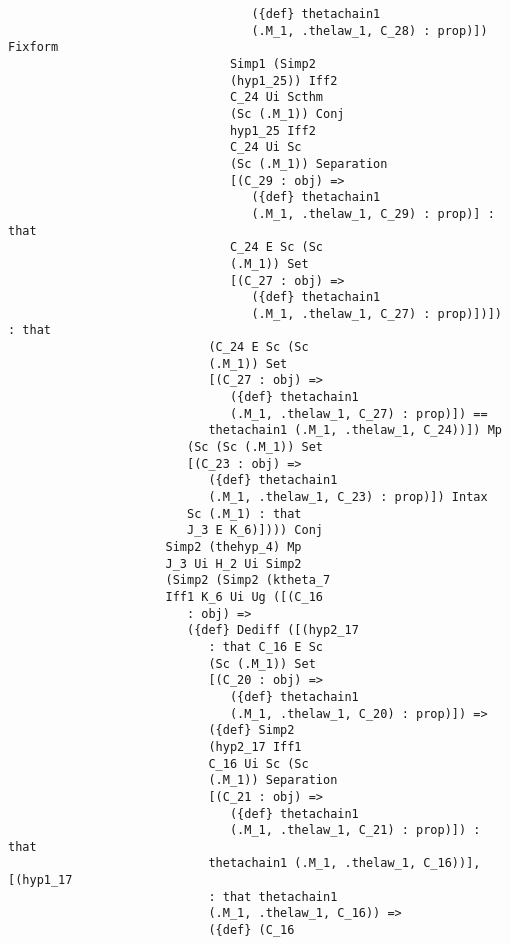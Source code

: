 \documentclass[12pt]{article}
\begin{document}
\begin{verbatim}
                                  ({def} thetachain1 
                                  (.M_1, .thelaw_1, C_28) : prop)]) Fixform 
                               Simp1 (Simp2 
                               (hyp1_25)) Iff2 
                               C_24 Ui Scthm 
                               (Sc (.M_1)) Conj 
                               hyp1_25 Iff2 
                               C_24 Ui Sc 
                               (Sc (.M_1)) Separation 
                               [(C_29 : obj) => 
                                  ({def} thetachain1 
                                  (.M_1, .thelaw_1, C_29) : prop)] : that 
                               C_24 E Sc (Sc 
                               (.M_1)) Set 
                               [(C_27 : obj) => 
                                  ({def} thetachain1 
                                  (.M_1, .thelaw_1, C_27) : prop)])]) : that 
                            (C_24 E Sc (Sc 
                            (.M_1)) Set 
                            [(C_27 : obj) => 
                               ({def} thetachain1 
                               (.M_1, .thelaw_1, C_27) : prop)]) == 
                            thetachain1 (.M_1, .thelaw_1, C_24))]) Mp 
                         (Sc (Sc (.M_1)) Set 
                         [(C_23 : obj) => 
                            ({def} thetachain1 
                            (.M_1, .thelaw_1, C_23) : prop)]) Intax 
                         Sc (.M_1) : that 
                         J_3 E K_6)]))) Conj 
                      Simp2 (thehyp_4) Mp 
                      J_3 Ui H_2 Ui Simp2 
                      (Simp2 (Simp2 (ktheta_7 
                      Iff1 K_6 Ui Ug ([(C_16 
                         : obj) => 
                         ({def} Dediff ([(hyp2_17 
                            : that C_16 E Sc 
                            (Sc (.M_1)) Set 
                            [(C_20 : obj) => 
                               ({def} thetachain1 
                               (.M_1, .thelaw_1, C_20) : prop)]) => 
                            ({def} Simp2 
                            (hyp2_17 Iff1 
                            C_16 Ui Sc (Sc 
                            (.M_1)) Separation 
                            [(C_21 : obj) => 
                               ({def} thetachain1 
                               (.M_1, .thelaw_1, C_21) : prop)]) : that 
                            thetachain1 (.M_1, .thelaw_1, C_16))], [(hyp1_17 
                            : that thetachain1 
                            (.M_1, .thelaw_1, C_16)) => 
                            ({def} (C_16 

\end{verbatim}
\end{document}
